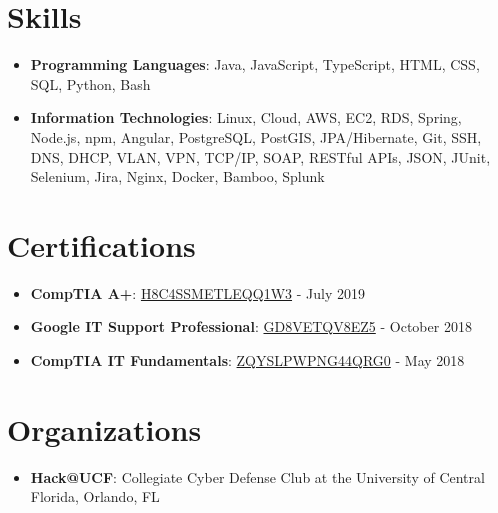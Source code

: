 \documentclass[letterpaper,11pt]{article}
\newcommand{\resumeItem}[2]{
  \item\small{
    \textbf{#1}{: #2 \vspace{-2pt}}
  }
}
\newcommand{\resumeSubItem}[2]{\resumeItem{#1}{#2}\vspace{-4pt}}
\newcommand{\resumeSubHeadingListStart}{\begin{itemize}[leftmargin=*]}
\newcommand{\resumeSubHeadingListEnd}{\end{itemize}}
\begin{document}
\section{Skills}
  \resumeSubHeadingListStart
    \resumeSubItem{Programming Languages}
      {Java, JavaScript, TypeScript, HTML, CSS, SQL, Python, Bash}
    \resumeSubItem{Information Technologies}
      {Linux, Cloud, AWS, EC2, RDS, Spring, Node.js, npm, Angular, PostgreSQL, PostGIS, JPA/Hibernate, Git, SSH, DNS, DHCP, VLAN, VPN, TCP/IP, SOAP, RESTful APIs, JSON, JUnit, Selenium, Jira, Nginx, Docker, Bamboo, Splunk}
  \resumeSubHeadingListEnd

\section{Certifications}
  \resumeSubHeadingListStart
    \resumeSubItem{CompTIA A+}
      {\href{https://www.certmetrics.com/comptia/public/verification.aspx?code=H8C4SSMETLEQQ1W3}{H8C4SSMETLEQQ1W3}} - {{July 2019}}
    \resumeSubItem{Google IT Support Professional}
      {\href{https://www.coursera.org/account/accomplishments/professional-cert/certificate/GD8VETQV8EZ5}{GD8VETQV8EZ5}} - {{October 2018}}
    \resumeSubItem{CompTIA IT Fundamentals}
      {\href{https://www.certmetrics.com/comptia/public/verification.aspx?code=ZQYSLPWPNG44QRG0}{ZQYSLPWPNG44QRG0}} - {{May 2018}}
  \resumeSubHeadingListEnd

\section{Organizations}
  \resumeSubHeadingListStart
    \resumeSubItem{Hack@UCF}
      {Collegiate Cyber Defense Club at the University of Central Florida, Orlando, FL}
  \resumeSubHeadingListEnd

\end{document}
